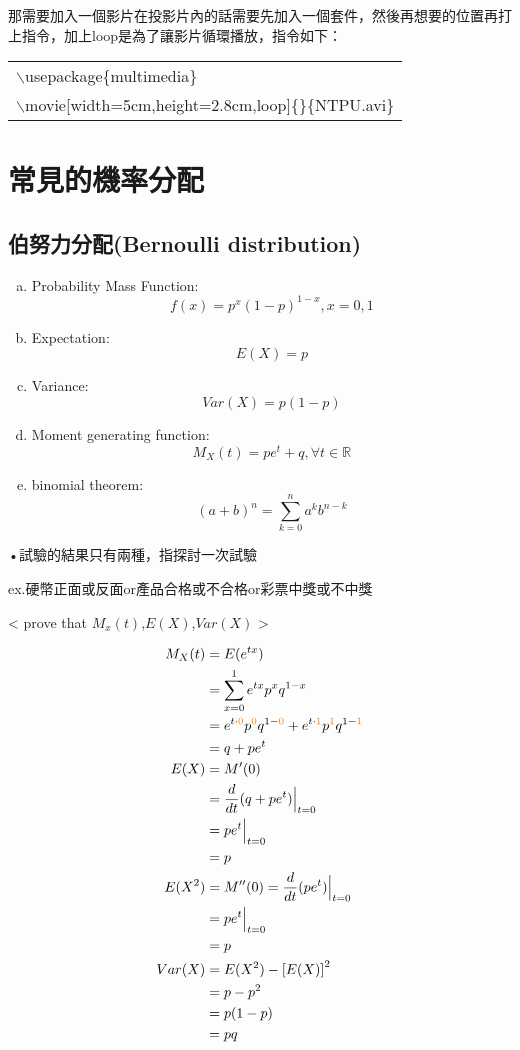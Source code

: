 那需要加入一個影片在投影片內的話需要先加入一個套件，然後再想要的位置再打上指令，加上loop是為了讓影片循環播放，指令如下：
\begin{center}\colorbox{slight}{\begin{tabular}{p{}}
    $\backslash$usepackage\{multimedia\}\\
    $\backslash$movie[width=5cm,height=2.8cm,loop]\{\}\{NTPU.avi\}
\end{tabular}}
\end{center}
\section{常見的機率分配}
\subsection{伯努力分配(Bernoulli distribution)}
\begin{enumerate}[(a)]

\item Probability Mass Function:$$f(x)=p^{x}(1-p)^{1-x},x=0,1$$

\item Expectation:$$E(X)=p$$

\item Variance:$$Var(X)=p(1-p)$$

\item Moment generating function:$$M_{X}(t)=pe^{t}+q,\forall t\in \mathbb{R}$$

\item binomial theorem:$$(a+b)^n=\sum_{k=0}^na^kb^{n-k}$$
\end{enumerate}
•試驗的結果只有兩種，指探討一次試驗

ex.硬幣正面或反面or產品合格或不合格or彩票中獎或不中獎

< prove that $M_{x}(t)$,$E(X)$,$Var(X)$ >

\begin{align*}
M_{X}(t) &= E(e^{tx}) \\
         &= \sum_{\substack{x = 0 \\ }}^1 e^{tx}p^{x}q^{1-x} \\
         &= e^{t\cdot\textcolor{orange}{0}}p^{\textcolor{orange}{0}}q^{1-\textcolor{orange}{0}}+e^{t\cdot\textcolor{orange}{1}}p^{\textcolor{orange}{1}}q^{1-\textcolor{orange}{1}} \\
         &= q+pe^{t} \\
E(X)     &= M'(0) \\
         &= \frac{d}{dt}(q+pe^{t})\Big|_{t=0}\\
         &=pe^{t}\Big|_{t=0}\\
         &=p\\
E(X^2)   &=M''(0)=\frac{d}{dt}(pe^{t})\Big|_{t=0}\\
         &=pe^{t}\Big|_{t=0}\\
         &=p\\
Var(X)   &=E(X^2)-\left[E(X)\right]^2\\
         &=p-p^2\\
         &=p(1-p)\\
         &=pq
\end{align*}

